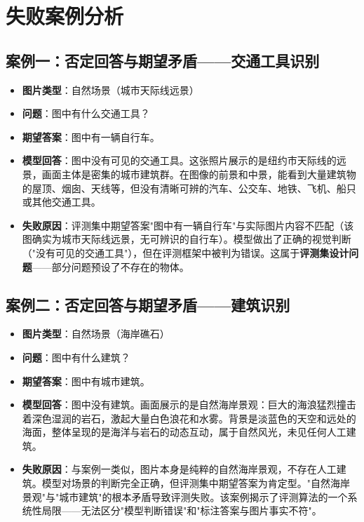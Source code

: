 \section{失败案例分析}

\subsection{案例一：否定回答与期望矛盾——交通工具识别}

\begin{itemize}
  \item \textbf{图片类型}：自然场景（城市天际线远景）
  \item \textbf{问题}：图中有什么交通工具？
  \item \textbf{期望答案}：图中有一辆自行车。
  \item \textbf{模型回答}：图中没有可见的交通工具。这张照片展示的是纽约市天际线的远景，画面主体是密集的城市建筑群。在图像的前景和中景，能看到大量建筑物的屋顶、烟囱、天线等，但没有清晰可辨的汽车、公交车、地铁、飞机、船只或其他交通工具。
  \item \textbf{失败原因}：评测集中期望答案"图中有一辆自行车"与实际图片内容不匹配（该图确实为城市天际线远景，无可辨识的自行车）。模型做出了正确的视觉判断（"没有可见的交通工具"），但在评测框架中被判为错误。这属于\textbf{评测集设计问题}——部分问题预设了不存在的物体。
\end{itemize}

\subsection{案例二：否定回答与期望矛盾——建筑识别}

\begin{itemize}
  \item \textbf{图片类型}：自然场景（海岸礁石）
  \item \textbf{问题}：图中有什么建筑？
  \item \textbf{期望答案}：图中有城市建筑。
  \item \textbf{模型回答}：图中没有建筑。画面展示的是自然海岸景观：巨大的海浪猛烈撞击着深色湿润的岩石，激起大量白色浪花和水雾。背景是淡蓝色的天空和远处的海面，整体呈现的是海洋与岩石的动态互动，属于自然风光，未见任何人工建筑。
  \item \textbf{失败原因}：与案例一类似，图片本身是纯粹的自然海岸景观，不存在人工建筑。模型对场景的判断完全正确，但评测集中期望答案为肯定型。"自然海岸景观"与"城市建筑"的根本矛盾导致评测失败。该案例揭示了评测算法的一个系统性局限——无法区分"模型判断错误"和"标注答案与图片事实不符"。
\end{itemize}

